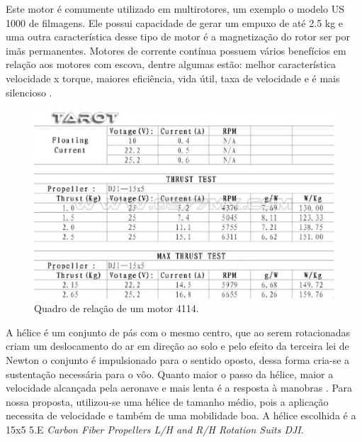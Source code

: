 Este motor é comumente utilizado em  multirotores, um exemplo o modelo US 1000 de filmagens. Ele possui capacidade de gerar um empuxo de até 
2.5 kg e uma outra característica desse tipo de motor é a magnetização do rotor ser por imãs permanentes. Motores de corrente contínua possuem 
vários benefícios em relação aos motores com escova, dentre algumas estão: melhor característica velocidade x torque, maiores eficiência, vida 
útil, taxa de velocidade e é mais silencioso \cite{nascimento}.

\begin{figure}[H]
    \centering
      \includegraphics[keepaspectratio=true,scale=0.5]{figuras/tarot.eps}
    \caption{Quadro de relação de um motor 4114.\cite{tarot}}
    \label{fig:tarot}
\end{figure}

A hélice é um conjunto de pás com o mesmo centro, que ao serem rotacionadas criam um deslocamento do ar em direção ao solo e pelo efeito da 
terceira lei de Newton o conjunto é impulsionado para o sentido oposto, dessa forma cria-se a sustentação necessária para o vôo.  
Quanto maior o passo da hélice, maior a velocidade alcançada  pela aeronave e mais lenta é a resposta à manobras \cite{VIOLATO}. 
Para nossa proposta, utilizou-se uma hélice de tamanho médio, pois a aplicação necessita de velocidade e também de uma mobilidade boa.
A hélice escolhida é a 15x5 5.E \textit{Carbon  Fiber  Propellers  L/H  and  R/H  Rotation  Suits DJI}.

